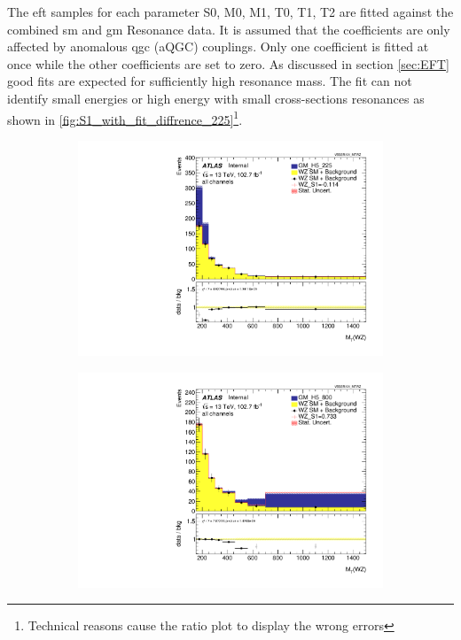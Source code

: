 \documentclass[../Bachelorarbeit.tex]{subfiles}
\begin{document}
\label{sec:results}
The \acrshort{eft} samples for each parameter S0, M0, M1, T0, T1, T2 are fitted against the combined \acrshort{sm} and \acrshort{gm} Resonance data. It is assumed that the coefficients are only affected by anomalous \acrshort{qgc} (aQGC) couplings.
Only one coefficient is fitted at once while the other coefficients are set to zero. As discussed in section \ref{sec:EFT} good fits are expected for sufficiently high resonance mass.
The fit can not identify small energies or high energy with small cross-sections resonances as shown in \ref{fig:S1_with_fit_diffrence_225}\footnote{Technical reasons cause the ratio plot to display the wrong errors}.

\begin{figure}[h]
    \centering
    \begin{subfigure}{0.3\textwidth}
        \includegraphics[width=\textwidth]{Plots/ALL_MTWZ_right_color/GM_H5_225/S1/2022-05-07/VBSSR/all_VV_MTWZ.pdf}
        \caption{}
    \end{subfigure}
    \begin{subfigure}{0.3\textwidth}
        \includegraphics[width=\textwidth]{Plots/ALL_MTWZ_right_color/GM_H5_800/S1/2022-05-07/VBSSR/all_VV_MTWZ.pdf}

\end{subfigure}
\end{figure}
\end{document}
